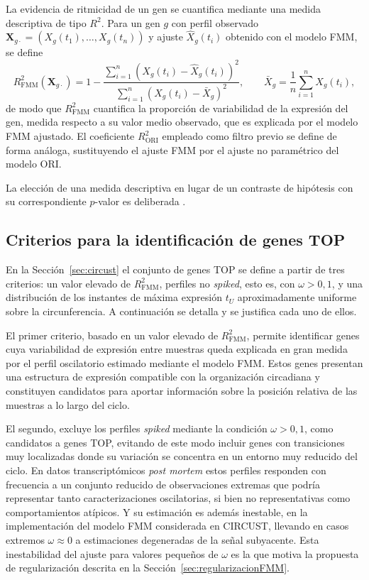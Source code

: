 \documentclass[12pt, a4paper]{report}
\begin{document}
La evidencia de ritmicidad de un gen se cuantifica mediante una medida descriptiva de tipo \(R^2\). Para un gen \(g\) con perfil observado \(\mathbf{X}_{g\cdot}=(X_g(t_1),\ldots,X_g(t_n))\) y ajuste \(\widehat{X}_g(t_i)\) obtenido con el modelo FMM, se define
\[
R^{2}_{\mathrm{FMM}}(\mathbf{X}_{g\cdot})=
1-\frac{\sum_{i=1}^{n}\left(X_g(t_i)-\widehat{X}_g(t_i)\right)^{2}}
{\sum_{i=1}^{n}\left(X_g(t_i)-\bar{X}_g\right)^{2}},
\qquad
\bar{X}_g=\frac{1}{n}\sum_{i=1}^{n}X_g(t_i),
\]
de modo que \(R^{2}_{\mathrm{FMM}}\) cuantifica la proporción de variabilidad de la expresión del gen, medida respecto a su valor medio observado, que es explicada por el modelo FMM ajustado. El coeficiente \(R^{2}_{\mathrm{ORI}}\) empleado como filtro previo se define de forma análoga, sustituyendo el ajuste FMM por el ajuste no paramétrico del modelo ORI.

La elección de una medida descriptiva en lugar de un contraste de hipótesis con su correspondiente \(p\)-valor es deliberada \citep{larriba2023}.

\subsection{Criterios para la identificación de genes TOP}

En la Sección~\ref{sec:circust} el conjunto de genes TOP se define a partir de tres criterios: un valor elevado de \(R^{2}_{\mathrm{FMM}}\), perfiles no \textit{spiked}, esto es, con \(\omega>0{,}1\), y una distribución de los instantes de máxima expresión \(t_U\) aproximadamente uniforme sobre la circunferencia. A continuación se detalla y se justifica cada uno de ellos.

El primer criterio, basado en un valor elevado de \(R^2_{\mathrm{FMM}}\), permite identificar genes cuya variabilidad de expresión entre muestras queda explicada en gran medida por el perfil oscilatorio estimado mediante el modelo FMM. Estos genes presentan una estructura de expresión compatible con la organización circadiana y constituyen candidatos para aportar información sobre la posición relativa de las muestras a lo largo del ciclo.

El segundo, excluye los perfiles \textit{spiked} mediante la condición \(\omega>0{,}1\), como candidatos a genes TOP, evitando de este modo incluir genes con transiciones muy localizadas donde su variación se concentra en un entorno muy reducido del ciclo. En datos transcriptómicos \textit{post mortem} estos perfiles responden con frecuencia a un conjunto reducido de observaciones extremas que podría representar tanto caracterizaciones oscilatorias, si bien no representativas como comportamientos atípicos. Y su estimación es además inestable, en la implementación del modelo FMM considerada en CIRCUST, llevando en casos extremos \(\omega\approx0\) a estimaciones degeneradas de la señal subyacente. Esta inestabilidad del ajuste para valores pequeños de \(\omega\) es la que motiva la propuesta de regularización descrita en la Sección~\ref{sec:regularizacionFMM}.
\end{document}
